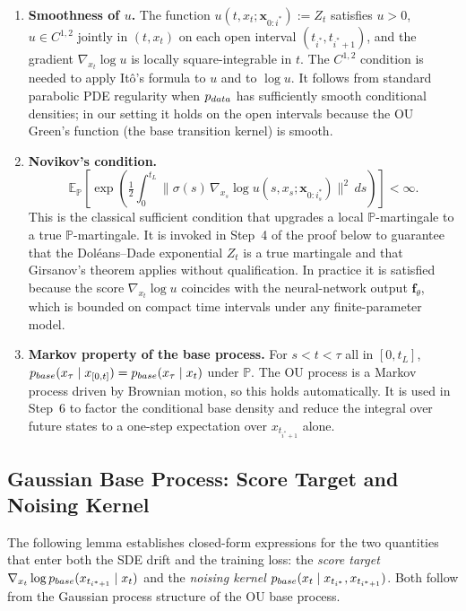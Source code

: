 \documentclass{article}
\newcommand{\pdata}{p_{\normalfont{data}}}
\newcommand{\pbase}{p_{\normalfont{base}}}
\newcommand{\PP}{\mathbb{P}}
\newcommand{\EE}{\mathbb{E}}
\begin{document}
\begin{enumerate}[label=\textbf{(R\arabic*)}]
\item \label{reg:smooth}
  \textbf{Smoothness of $u$.}
  The function $u(t,x_t;\mathbf{x}_{0:i^*}):=Z_t$ satisfies $u>0$,
  $u\in C^{1,2}$ jointly in $(t,x_t)$ on each open interval $(t_{i^*},t_{i^*+1})$,
  and the gradient $\nabla_{x_t}\log u$ is locally square-integrable in $t$.
  The $C^{1,2}$ condition is needed to apply It\^o's formula to $u$ and to $\log u$.
  It follows from standard parabolic PDE regularity when $\pdata$ has sufficiently
  smooth conditional densities; in our setting it holds on the open intervals because
  the OU Green's function (the base transition kernel) is smooth.

\item \label{reg:novikov}
  \textbf{Novikov's condition.}
  \[
    \EE_\PP\left[\exp\left(
      \tfrac{1}{2}\int_0^{t_L}
      \|\sigma(s)\,\nabla_{x_s}\log u(s,x_s;\mathbf{x}_{0:i^*_s})\|^2\,ds
    \right)\right]<\infty.
  \]
  This is the classical sufficient condition \cite{novikov1972identity}
  that upgrades a local $\PP$-martingale to a true $\PP$-martingale.  It is invoked
  in Step~4 of the proof below to guarantee that the Dol\'eans--Dade exponential
  $Z_t$ is a true martingale and that Girsanov's theorem \cite{girsanov1960transforming} applies without qualification.
  In practice it is satisfied because the score $\nabla_{x_t}\log u$ coincides with
  the neural-network output $\mathbf{f}_\theta$, which is bounded on compact time
  intervals under any finite-parameter model.

\item \label{reg:markov}
  \textbf{Markov property of the base process.}
  For $s<t<\tau$ all in $[0,t_L]$,
  $\pbase(x_\tau\mid x_{[0,t]})=\pbase(x_\tau\mid x_t)$ under $\PP$.
  The OU process is a Markov process driven by Brownian motion, so this holds
  automatically.  It is used in Step~6 to factor the conditional base density
  and reduce the integral over future states to a one-step expectation over
  $x_{t_{i^*+1}}$ alone.

\end{enumerate}

\subsection{Gaussian Base Process: Score Target and Noising Kernel}

The following lemma establishes closed-form expressions for the two quantities
that enter both the SDE drift and the training loss: the \emph{score target}
$\nabla_{x_t}\log\pbase(x_{t_{i^*+1}}\mid x_t)$ and the \emph{noising kernel}
$\pbase(x_t\mid x_{t_{i^*}},x_{t_{i^*+1}})$.  Both follow from the Gaussian
process structure of the OU base process.
\end{document}
